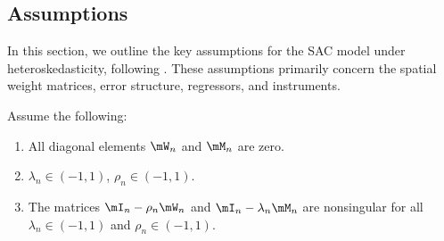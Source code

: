 % 
% 



% 






\subsection{Assumptions}

In this section, we outline the key assumptions for the SAC model under heteroskedasticity, following \cite{arraiz2010spatial}. These assumptions primarily concern the spatial weight matrices, error structure, regressors, and instruments.

\begin{assumption}\label{assump:w_matri_gmm}
	Assume the following:
	\begin{enumerate}
		\item All diagonal elements $\mW_n$ and $\mM_n$ are zero.
		\item $\lambda_n\in (-1, 1)$, $\rho_n \in (-1, 1)$.
		\item The matrices $\mI_n - \rho_n \mW_n$ and $\mI_n - \lambda_n \mM_n$ are nonsingular for all $\lambda_n\in (-1, 1)$ and $\rho_n \in (-1, 1)$.
	\end{enumerate}
\end{assumption}	


